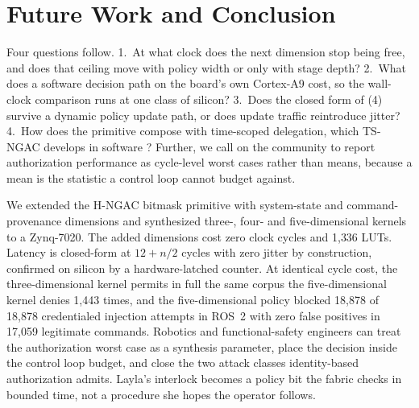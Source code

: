 \documentclass[conference]{IEEEtran}
\newcommand{\new}[1]{\textcolor{hkred}{#1}}
\begin{document}
\section{Future Work and Conclusion}
\label{sec:conclusion}

Four questions follow. \new{1.~At what clock does the next dimension stop being free, and does that ceiling move with policy width or only with stage depth? 2.~What does a software decision path on the board's own Cortex-A9 cost, so the wall-clock comparison runs at one class of silicon?} 3.~Does the closed form of (4) survive a dynamic policy update path, or does update traffic reintroduce jitter? 4.~How does the primitive compose with time-scoped delegation, which TS-NGAC develops in software \cite{karim2026tsngac}? Further, we call on the community to report authorization performance as cycle-level worst cases rather than means, because a mean is the statistic a control loop cannot budget against.

We extended the H-NGAC bitmask primitive with system-state and command-provenance dimensions and synthesized \new{three-, }four- and five-dimensional kernels to a Zynq-7020. The added \new{dimensions} cost zero clock cycles and \new{1{,}336} LUTs. Latency is closed-form at $12 + n/2$ cycles with zero jitter by construction\new{, confirmed on silicon by a hardware-latched counter. At identical cycle cost, the three-dimensional kernel permits in full the same corpus the five-dimensional kernel denies 1{,}443 times}, and the five-dimensional policy blocked 18{,}878 of 18{,}878 credentialed injection attempts in ROS~2 with zero false positives in 17{,}059 legitimate commands. Robotics and functional-safety engineers can treat the authorization worst case as a synthesis parameter, place the decision inside the control loop budget, and close the two attack classes identity-based authorization admits. Layla's interlock becomes a policy bit the fabric checks in bounded time, not a procedure she hopes the operator follows.



\end{document}
